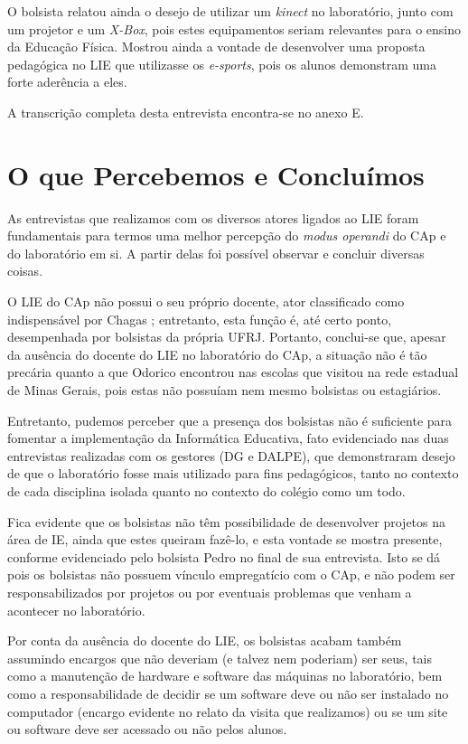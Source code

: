 O bolsista relatou ainda o desejo de utilizar um \textit{kinect} no laboratório, junto com um projetor e um \textit{X-Box}, pois estes equipamentos seriam relevantes para o ensino da Educação Física. Mostrou ainda a vontade de desenvolver uma proposta pedagógica no LIE que utilizasse os \textit{e-sports}, pois os alunos demonstram uma forte aderência a eles.

A transcrição completa desta entrevista encontra-se no anexo E.

\section{O que Percebemos e Concluímos}\label{chp:LABEL_CHP_ENT_OBS_CONC}

As entrevistas que realizamos com os diversos atores ligados ao LIE foram fundamentais para termos uma melhor percepção do \textit{modus operandi} do CAp e do laboratório em si. A partir delas foi possível observar e concluir diversas coisas.

O LIE do CAp não possui o seu próprio docente, ator classificado como indispensável por Chagas \cite{art:REF_ART_CHAGAS}; entretanto, esta função é, até certo ponto, desempenhada por bolsistas da própria UFRJ. Portanto, conclui-se que, apesar da ausência do docente do LIE no laboratório do CAp, a situação não é tão precária quanto a que Odorico \cite{art:REF_ART_ODORICO} encontrou nas escolas que visitou na rede estadual de Minas Gerais, pois estas não possuíam nem mesmo bolsistas ou estagiários.

Entretanto, pudemos perceber que a presença dos bolsistas não é suficiente para fomentar a implementação da Informática Educativa, fato evidenciado nas duas entrevistas realizadas com os gestores (DG e DALPE), que demonstraram desejo de que o laboratório fosse mais utilizado para fins pedagógicos, tanto no contexto de cada disciplina isolada quanto no contexto do colégio como um todo.

Fica evidente que os bolsistas não têm possibilidade de desenvolver projetos na área de IE, ainda que estes queiram fazê-lo, e esta vontade se mostra presente, conforme evidenciado pelo bolsista Pedro no final de sua entrevista. Isto se dá pois os bolsistas não possuem vínculo empregatício com o CAp, e não podem ser responsabilizados por projetos ou por eventuais problemas que venham a acontecer no laboratório.

Por conta da ausência do docente do LIE, os bolsistas acabam também assumindo encargos que não deveriam (e talvez nem poderiam) ser seus, tais como a manutenção de hardware e software das máquinas no laboratório, bem como a responsabilidade de decidir se um software deve ou não ser instalado no computador (encargo evidente no relato da visita que realizamos) ou se um site ou software deve ser acessado ou não pelos alunos.

